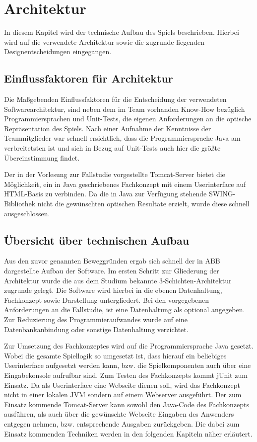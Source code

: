 \clearpage
\chapter{Architektur}
In diesem Kapitel wird der technische Aufbau des Spiels beschrieben. Hierbei wird auf die verwendete Architektur sowie die zugrunde liegenden Designentscheidungen eingegangen.

\section{Einflussfaktoren für Architektur}
Die Maßgebenden Einflussfaktoren für die Entscheidung der verwendeten Softwarearchitektur, sind neben dem im Team vorhanden Know-How bezüglich Programmiersprachen und Unit-Tests, die eigenen Anforderungen an die optische Repräsentation des Spiels. Nach einer Aufnahme der Kenntnisse der Teammitglieder war schnell ersichtlich, dass die Programmiersprache Java am verbreitetsten ist und sich in Bezug auf Unit-Tests auch hier die größte Übereinstimmung findet.

Der in der Vorlesung zur Fallstudie vorgestellte Tomcat-Server bietet die Möglichkeit, ein in Java geschriebenes Fachkonzept mit einem Userinterface auf HTML-Basis zu verbinden. Da die in Java zur Verfügung stehende SWING-Bibliothek nicht die gewünschten optischen Resultate erzielt, wurde diese schnell ausgeschlossen.

\section{Übersicht über technischen Aufbau}
Aus den zuvor genannten Beweggründen ergab sich schnell der in ABB dargestellte Aufbau der Software. Im ersten Schritt zur Gliederung der Architektur wurde die aus dem Studium bekannte 3-Schichten-Architektur zugrunde gelegt. Die Software wird hierbei in die ebenen Datenhaltung, Fachkonzept sowie Darstellung untergliedert. Bei den vorgegebenen Anforderungen an die Fallstudie, ist eine Datenhaltung als optional angegeben. Zur Reduzierung des Programmieraufwandes wurde auf eine Datenbankanbindung oder sonstige Datenhaltung verzichtet.

Zur Umsetzung des Fachkonzeptes wird auf die Programmiersprache Java gesetzt. Wobei die gesamte Spiellogik so umgesetzt ist, dass hierauf ein beliebiges Userinterface aufgesetzt werden kann, bzw. die Spielkomponenten auch über eine Eingabekonsole aufrufbar sind. Zum Testen des Fachkonzepts kommt jUnit zum Einsatz. Da als Userinterface eine Webseite dienen soll, wird das Fachkonzept nicht in einer lokalen JVM sondern auf einem Webserver ausgeführt. Der zum Einsatz kommende Tomcat-Server kann sowohl den Java-Code des Fachkonzepts ausführen, als auch über die gewünschte Webseite Eingaben des Anwenders entgegen nehmen, bzw. entsprechende Ausgaben zurückgeben. Die dabei zum Einsatz kommenden Techniken werden in den folgenden Kapiteln näher erläutert.

